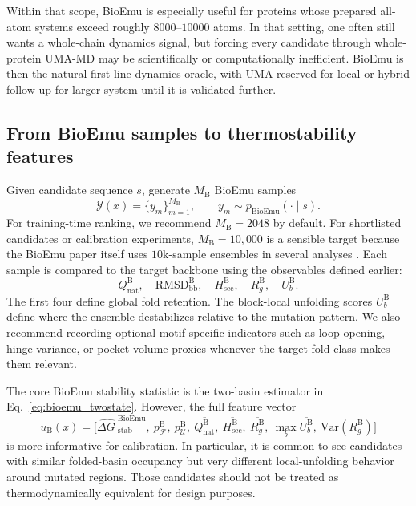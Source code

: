 \documentclass[11pt]{article}
\newcommand{\dG}{\ensuremath{\Delta G \ }}
\begin{document}
	Within that scope, BioEmu is especially useful for proteins whose prepared all-atom systems exceed roughly $8000$--$10000$ atoms. In that setting, one often still wants a whole-chain dynamics signal, but forcing every candidate through whole-protein UMA-MD may be scientifically or computationally inefficient. BioEmu is then the natural first-line dynamics oracle, with UMA reserved for local or hybrid follow-up for larger system until it is validated further.
	
	\subsection{From BioEmu samples to thermostability features}
	
	Given candidate sequence $s$, generate $M_{\mathrm B}$ BioEmu samples
	\[
	\mathcal{Y}(x)=\{y_m\}_{m=1}^{M_{\mathrm B}}, \qquad y_m \sim p_{\mathrm{BioEmu}}(\cdot\mid s).
	\]
	For training-time ranking, we recommend $M_{\mathrm B}=2048$ by default. For shortlisted candidates or calibration experiments, $M_{\mathrm B}=10{,}000$ is a sensible target because the BioEmu paper itself uses $10$k-sample ensembles in several analyses \citep{lewis2024bioemu}. Each sample is compared to the target backbone using the observables defined earlier:
	\[
	Q_{\mathrm{nat}}^{\mathrm B},\quad \mathrm{RMSD}_{\mathrm{bb}}^{\mathrm B},\quad H_{\mathrm{sec}}^{\mathrm B},\quad R_g^{\mathrm B},\quad U_b^{\mathrm B}.
	\]
	The first four define global fold retention. The block-local unfolding scores $U_b^{\mathrm B}$ define where the ensemble destabilizes relative to the mutation pattern. We also recommend recording optional motif-specific indicators such as loop opening, hinge variance, or pocket-volume proxies whenever the target fold class makes them relevant.
	
	The core BioEmu stability statistic is the two-basin estimator in Eq.~\eqref{eq:bioemu_twostate}. However, the full feature vector
	\[
	u_{\mathrm B}(x)=\Big[\widehat{\dG}^{\mathrm{BioEmu}}_{\mathrm{stab}},\ p_{\mathcal F}^{\mathrm B},\ p_{\mathcal U}^{\mathrm B},\ \overline{Q_{\mathrm{nat}}^{\mathrm B}},\ \overline{H_{\mathrm{sec}}^{\mathrm B}},\ \overline{R_g^{\mathrm B}},\ \max_b \overline{U_b^{\mathrm B}},\ \mathrm{Var}(R_g^{\mathrm B})\Big]
	\]
	is more informative for calibration. In particular, it is common to see candidates with similar folded-basin occupancy but very different local-unfolding behavior around mutated regions. Those candidates should not be treated as thermodynamically equivalent for design purposes.
	
\end{document}

